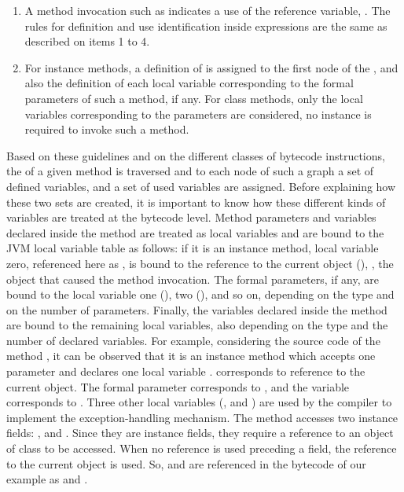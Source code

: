 \begin{enumerate}
    \item A method invocation such as  indicates
    a use of the reference variable, . The rules for
    definition and use identification inside expressions  are the same as described on items 1 to 4.

    \item For instance methods, a definition of  is assigned to the
    first node of the \IG, and also the definition of each local variable
    corresponding to the formal parameters of such a method, if any.
    For class methods, only the local variables corresponding to the parameters
    are considered, no instance is required to invoke such a method.
\end{enumerate}

Based on these guidelines and on the different classes of bytecode
instructions, the \IG of a given method is traversed and to each
node of such a graph a set  of defined variables, and a
set  of used variables are assigned. Before explaining
how these two sets are created, it is important to know how these
different kinds of variables are treated at the bytecode level.
Method parameters and variables declared inside the method are
treated as local variables and are bound to the JVM local variable
table as follows: if it is an instance method, local variable
zero, referenced here as , is bound to the reference to
the current object (), \ie, the object that caused the
method invocation. The formal parameters, if any, are bound to the
local variable one (), two (), and so on,
depending on the type and on the number of parameters. Finally,
the variables declared inside the method are bound to the
remaining local variables, also depending on the type and the
number of declared variables. For example, considering the source
code of the method , it can be observed that it is
an instance method which accepts one parameter  and
declares one local variable .  corresponds to
reference to the current object. The formal parameter 
corresponds to , and the variable  corresponds to
. Three other local variables (,  and
) are used by the compiler to implement the
exception-handling mechanism. The method accesses two instance
fields: , and . Since they are instance fields,
they require a reference to an object of class  to be
accessed. When no reference is used preceding a field, the
reference to the current object is used. So,  and 
are referenced in the bytecode of our example as  and
.

